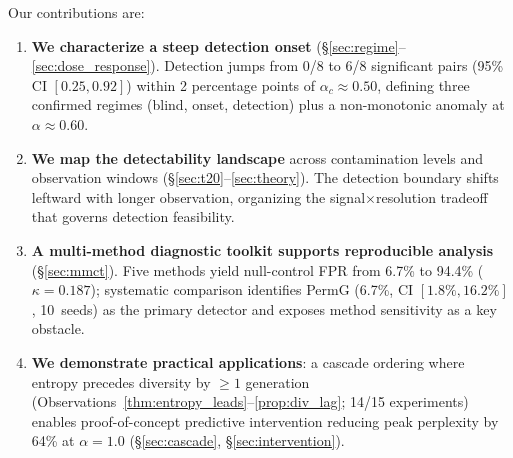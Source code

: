 Our contributions are:
\begin{enumerate}
    \item \textbf{We characterize a steep detection onset} (\S\ref{sec:regime}--\ref{sec:dose_response}).
    Detection jumps from 0/8 to 6/8 significant pairs (95\% CI $[0.25, 0.92]$) within 2 percentage points of $\alpha_c \approx 0.50$, defining three confirmed regimes (blind, onset, detection) plus a non-monotonic anomaly at $\alpha \approx 0.60$.

    \item \textbf{We map the detectability landscape} across contamination levels and observation windows (\S\ref{sec:t20}--\ref{sec:theory}).
    The detection boundary shifts leftward with longer observation, organizing the signal$\times$resolution tradeoff that governs detection feasibility.

    \item \textbf{A multi-method diagnostic toolkit supports reproducible analysis} (\S\ref{sec:mmct}).
    Five methods yield null-control FPR from 6.7\% to 94.4\% ($\kappa{=}0.187$); systematic comparison identifies PermG (6.7\%, CI $[1.8\%, 16.2\%]$, 10~seeds) as the primary detector and exposes method sensitivity as a key obstacle.

    \item \textbf{We demonstrate practical applications}: a cascade ordering where entropy precedes diversity by ${\geq}1$ generation (Observations~\ref{thm:entropy_leads}--\ref{prop:div_lag}; 14/15 experiments) enables proof-of-concept predictive intervention reducing peak perplexity by 64\% at $\alpha{=}1.0$ (\S\ref{sec:cascade}, \S\ref{sec:intervention}).
\end{enumerate}
